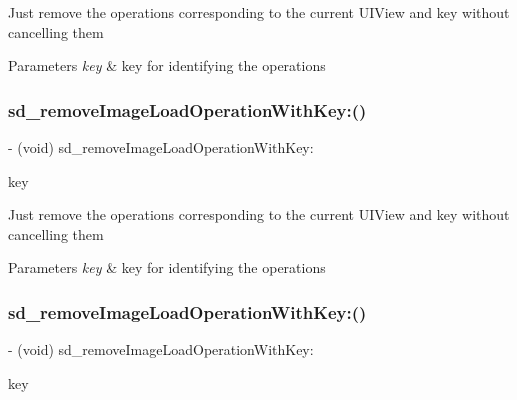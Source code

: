 Just remove the operations corresponding to the current U\+I\+View and key without cancelling them


\begin{DoxyParams}{Parameters}
{\em key} & key for identifying the operations \\
\hline
\end{DoxyParams}
\mbox{\label{category_u_i_view_07_web_cache_operation_08_ac2791e01e33c9b0211190ce64d9c1283}} 
\subsubsection{\texorpdfstring{sd\+\_\+remove\+Image\+Load\+Operation\+With\+Key\+:()}{sd\_removeImageLoadOperationWithKey:()}\hspace{0.1cm}{\footnotesize\ttfamily [2/3]}}
{\footnotesize\ttfamily -\/ (void) sd\+\_\+remove\+Image\+Load\+Operation\+With\+Key\+: \begin{DoxyParamCaption}\item[{(N\+S\+String $\ast$)}]{key }\end{DoxyParamCaption}}

Just remove the operations corresponding to the current U\+I\+View and key without cancelling them


\begin{DoxyParams}{Parameters}
{\em key} & key for identifying the operations \\
\hline
\end{DoxyParams}
\mbox{\label{category_u_i_view_07_web_cache_operation_08_ac2791e01e33c9b0211190ce64d9c1283}} 
\subsubsection{\texorpdfstring{sd\+\_\+remove\+Image\+Load\+Operation\+With\+Key\+:()}{sd\_removeImageLoadOperationWithKey:()}\hspace{0.1cm}{\footnotesize\ttfamily [3/3]}}
{\footnotesize\ttfamily -\/ (void) sd\+\_\+remove\+Image\+Load\+Operation\+With\+Key\+: \begin{DoxyParamCaption}\item[{(N\+S\+String $\ast$)}]{key }\end{DoxyParamCaption}}

